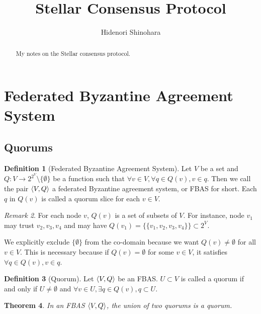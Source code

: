 \documentclass[12pt, psamsfonts]{amsart}
\newtheorem{thm}{Theorem}[subsection]
\theoremstyle{definition}
\newtheorem{defn}[thm]{Definition}
\theoremstyle{remark}
\newtheorem{rem}[thm]{Remark}
\numberwithin{equation}{subsection}
\begin{document}
\title{Stellar Consensus Protocol}
\author{Hidenori Shinohara}

\begin{abstract}
    My notes on the Stellar consensus protocol.
\end{abstract}

\maketitle

\tableofcontents

\section{Federated Byzantine Agreement System}

\subsection{Quorums}

\begin{defn}[Federated Byzantine Agreement System]
    Let $V$ be a set and $Q:V \rightarrow 2^{2^V} \setminus \{ \emptyset \}$ be a function such that $\forall v \in V, \forall q \in Q(v), v \in q$.
    Then we call the pair $\ev{V, Q}$ a federated Byzantine agreement system, or FBAS for short.
    Each $q$ in $Q(v)$ is called a quorum slice for each $v \in V$.
\end{defn}

\begin{rem}
    For each node $v$, $Q(v)$ is a set of subsets of $V$.
    For instance, node $v_1$ may trust $v_2, v_3, v_4$ and may have $Q(v_1) = \{ \{ v_1, v_2, v_3, v_4 \} \} \subset 2^V$.

    We explicitly exclude $\{ \emptyset \}$ from the co-domain because we want $Q(v) \ne \emptyset$ for all $v \in V$.
    This is necessary because if $Q(v) = \emptyset$ for some $v \in V$, it satisfies $\forall q \in Q(v), v \in q$.
\end{rem}

\begin{defn}[Quorum]
    Let $\ev{V, Q}$ be an FBAS\@.
    $U \subset V$ is called a quorum if and only if $U \ne \emptyset$ and $\forall v \in U, \exists q \in Q(v), q \subset U$.
\end{defn}

\begin{thm}\label{union_quorums}
    In an FBAS $\ev{V, Q}$, the union of two quorums is a quorum.
\end{thm}
\end{document}
